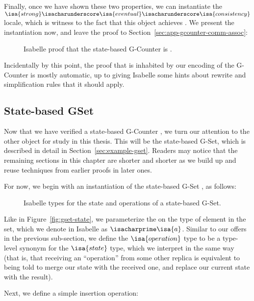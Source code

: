 Finally, once we have shown these two properties, we can instantiate the
$\isa{strong}\isacharunderscore\isa{eventual}\isacharunderscore\isa{consistency}$
locale, which is witness to the fact that this \CRDT object achieves \SEC. We
present the instantiation now, and leave the proof to
Section~\ref{sec:app-gcounter-comm-assoc}:

\begin{figure}[H]
  
  \caption{Isabelle proof that the state-based G-Counter \CRDT is \SEC.}
\end{figure}

Incidentally by this point, the proof that \SEC is inhabited by our encoding of
the G-Counter \SEC is mostly automatic, up to giving Isabelle some hints about
rewrite and simplification rules that it should apply.

\subsection{State-based GSet}
\label{sec:state-gset}

Now that we have verified a state-based G-Counter \CRDT, we turn our attention
to the other \CRDT object for study in this thesis. This will be the state-based
G-Set, which is described in detail in Section~\ref{sec:example-gset}. Readers
may notice that the remaining sections in this chapter are shorter and shorter
as we build up and reuse techniques from earlier proofs in later ones.

For now, we begin with an instantiation of the state-based G-Set \CRDT, as
follows:

\begin{figure}[H]
  
  \caption{Isabelle types for the state and operations of a state-based G-Set.}
\end{figure}

Like in Figure~\ref{fig:gset-state}, we parameterize the \CRDT on the type of
element in the set, which we denote in Isabelle as $\isacharprime\isa{a}$.
Similar to our offers in the previous sub-section, we define the
$\isa{operation}$ type to be a type-level synonym for the $\isa{state}$ type,
which we interpret in the same way (that is, that receiving an ``operation''
from some other replica is equivalent to being told to merge our state with the
received one, and replace our current state with the result).

Next, we define a simple insertion operation:

